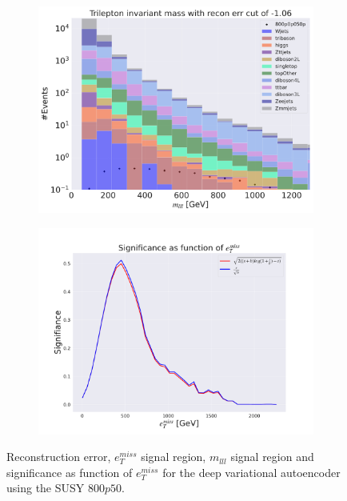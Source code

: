 \begin{figure}[H]
    \hfill
    \begin{subfigure}{.49\textwidth}
        \includegraphics[width=\textwidth]{Figures/VAE_testing/big/3lep/b_data_recon_big_rm3_feats_sig_800p0p050p_mlll_recon_errcut_-1.06.pdf}
        \caption{}
        \label{fig:VAE_3lep_big_mlll_800}
    \end{subfigure}
    \hfill   
    \begin{subfigure}{.49\textwidth}
        \includegraphics[width=\textwidth]{Figures/VAE_testing/big/3lep/significance_etmiss_800p0p050p_-1.0588523538160817.pdf}
        \caption{}
        \label{fig:VAE_3lep_big_signi_800}
    \end{subfigure}
    \hfill      
    \caption[3lep deep network | $800p50$ | VAE]{Reconstruction error, $e_T^{miss}$ signal region, $m_{lll}$ signal region and significance as function of 
    $e_T^{miss}$ for the deep variational autoencoder using the SUSY $800p50$.}
    \label{fig:VAE_3lep_big_rec_sig_signi_800}
\end{figure}

